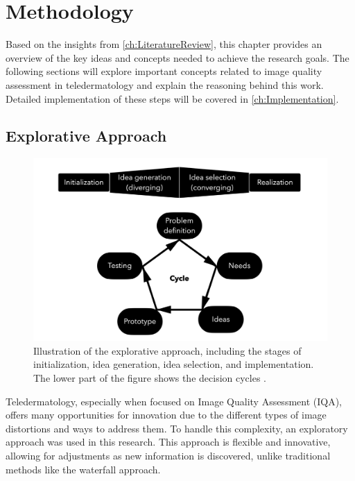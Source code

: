 \chapter{Methodology}
\label{ch:Methodology}
Based on the insights from \autoref{ch:LiteratureReview}, this chapter provides an overview of the key ideas and concepts needed to achieve the research goals. The following sections will explore important concepts related to image quality assessment in teledermatology and explain the reasoning behind this work. Detailed implementation of these steps will be covered in \autoref{ch:Implementation}.\par

\section{Explorative Approach}
\label{sec:ExplorativeApproach}
\begin{figure}[ht]
    \centering
    \includegraphics[keepaspectratio,width=13cm]{img/DecisionCycle.jpg}
    \caption{Illustration of the explorative approach, including the stages of initialization, idea generation, idea selection, and implementation. The lower part of the figure shows the decision cycles \autocite{DesignThinking}.}
    \label{fig:decision_cycle}
\end{figure}
\noindent
Teledermatology, especially when focused on Image Quality Assessment (IQA), offers many opportunities for innovation due to the different types of image distortions and ways to address them. To handle this complexity, an exploratory approach was used in this research. This approach is flexible and innovative, allowing for adjustments as new information is discovered, unlike traditional methods like the waterfall approach. \par
